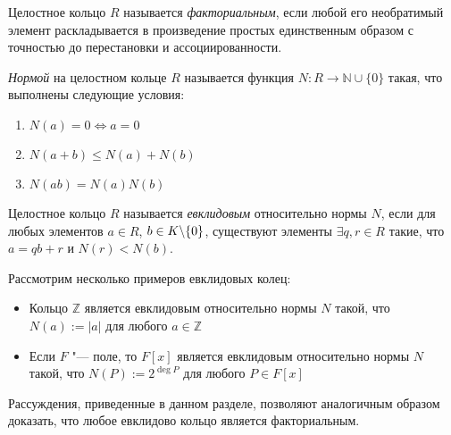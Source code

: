 \begin{definition}
	Целостное кольцо $R$ называется \textit{факториальным}, если любой его необратимый элемент раскладывается в произведение простых единственным образом с точностью до перестановки и ассоциированности.
\end{definition}

\begin{definition}
	\textit{Нормой} на целостном кольце $R$ называется функция $N: R \rightarrow \mathbb{N}\cup\{0\}$ такая, что выполнены следующие условия:
	\begin{enumerate}
		\item $N(a) = 0 \Leftrightarrow a = 0$
		\item $N(a + b) \le N(a) + N(b)$
		\item $N(ab) = N(a)N(b)$
	\end{enumerate}
\end{definition}
	
\begin{definition}
	Целостное кольцо $R$ называется \textit{евклидовым} относительно нормы $N$, если для любых элементов $a \in R$, $b \in K \backslash \{0\}$, существуют элементы $\exists q, r \in R$ такие, что $a = qb + r$ и $N(r) < N(b)$.
\end{definition}
	
\begin{example}
	Рассмотрим несколько примеров евклидовых колец:
	\begin{itemize}
		\item Кольцо $\mathbb{Z}$ является евклидовым относительно нормы $N$ такой, что $N(a) := |a|$ для любого $a \in \mathbb{Z}$
		\item Если $F$ "--- поле, то $F[x]$ является евклидовым относительно нормы $N$ такой, что $N(P) := 2^{\deg{P}}$ для любого $P \in F[x]$
	\end{itemize}
\end{example}
	
\begin{note}
	Рассуждения, приведенные в данном разделе, позволяют аналогичным образом доказать, что любое евклидово кольцо является факториальным.
\end{note}